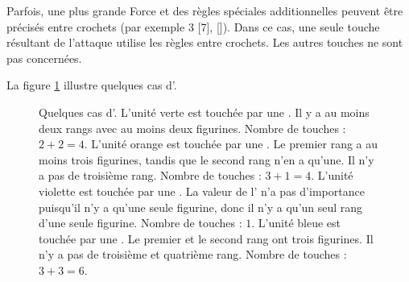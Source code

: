 Parfois, une plus grande Force et des règles spéciales additionnelles peuvent être précisés entre crochets (par exemple \Strength{} 3 [7], []). Dans ce cas, une seule touche résultant de l'attaque utilise les règles entre crochets. Les autres touches ne sont pas concernées.

La figure \ref{figure/areaattack} illustre quelques cas d'\areaattack{}.

\newcommand{\figAAOneHit}{\normalfontsize{1 touche}}
\newcommand{\figAATwoHits}{\normalfontsize{2 touches}}
\newcommand{\figAAThreeHits}{\normalfontsize{3 touches}}
\newcommand{\figAATotalOneHit}{Total : 1 touche}
\newcommand{\figAATotalFourHits}{Total : 4 touches}
\newcommand{\figAATotalSixHits}{Total : 6 touches}
\newcommand{\figAAAreaAttack}[1]{\areaattack{#1}}

\begin{figure}[!htbp]
\centering
\hypertarget{areaattackfigure}{
\def\svgwidth{0.6\textwidth}

}
\caption{Quelques cas d'\areaattack{}.\vspace*{10pt}\newline
L'unité verte est touchée par une . Il y a au moins deux rangs avec au moins deux figurines.\newline
Nombre de touches : $ 2 + 2 = 4 $.\vspace*{10pt}\newline
L'unité orange est touchée par une . Le premier rang a au moins trois figurines, tandis que le second rang n'en a qu'une. Il n'y a pas de troisième rang.\newline
Nombre de touches : $ 3 + 1 = 4 $.\vspace*{10pt}\newline
L'unité violette est touchée par une \areaattack{}. La valeur de l'\areaattack{} n'a pas d'importance puisqu'il n'y a qu'une seule figurine, donc il n'y a qu'un seul rang d'une seule figurine.\newline
Nombre de touches : $ 1 $.\vspace*{10pt}\newline
L'unité bleue est touchée par une . Le premier et le second rang ont trois figurines. Il n'y a pas de troisième et quatrième rang.\newline
Nombre de touches : $ 3 + 3 = 6 $.%
}
\label{figure/areaattack}
\end{figure}


